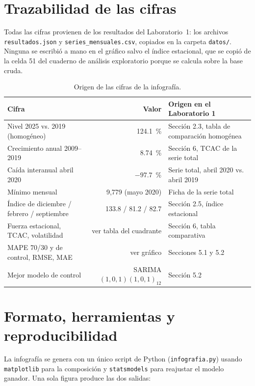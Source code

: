 \documentclass[12pt,letterpaper]{article}
\begin{document}
\section{Trazabilidad de las cifras}

Todas las cifras provienen de los resultados del Laboratorio~1: los archivos
\texttt{resultados.json} y \texttt{series\_mensuales.csv}, copiados en la carpeta
\texttt{datos/}. Ninguna se escribió a mano en el
gráfico salvo el índice estacional, que se copió de la celda 51 del cuaderno de análisis
exploratorio porque se calcula sobre la base cruda.

\begin{table}[H]
\centering
\small
\begin{tabularx}{\textwidth}{lrX}
\toprule
\textbf{Cifra} & \textbf{Valor} & \textbf{Origen en el Laboratorio 1} \\
\midrule
Nivel 2025 vs. 2019 (homogéneo) & 124.1~\% & Sección 2.3, tabla de comparación homogénea \\
Crecimiento anual 2009--2019 & 8.74~\% & Sección 6, TCAC de la serie total \\
Caída interanual abril 2020 & $-97.7$~\% & Serie total, abril 2020 vs. abril 2019 \\
Mínimo mensual & 9,779 (mayo 2020) & Ficha de la serie total \\
Índice de diciembre / febrero / septiembre & 133.8 / 81.2 / 82.7 & Sección 2.5, índice estacional \\
Fuerza estacional, TCAC, volatilidad & ver tabla del cuadrante & Sección 6, tabla comparativa \\
MAPE 70/30 y de control, RMSE, MAE & ver gráfico & Secciones 5.1 y 5.2 \\
Mejor modelo de control & SARIMA$(1,0,1)(1,0,1)_{12}$ & Sección 5.2 \\
\bottomrule
\end{tabularx}
\caption{Origen de las cifras de la infografía.}
\end{table}

\section{Formato, herramientas y reproducibilidad}

La infografía se genera con un único script de Python (\texttt{infografia.py}) usando
\texttt{matplotlib} para la composición y \texttt{statsmodels} para reajustar el modelo ganador.
Una sola figura produce las dos salidas:
\end{document}
